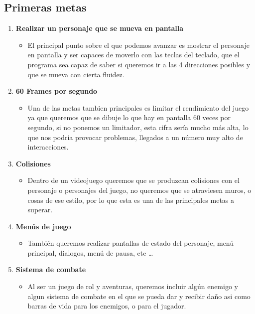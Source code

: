 \documentclass[a4paper]{article}
\begin{document}
\subsection{Primeras metas}
\begin{enumerate}
    \item \textbf{Realizar un personaje que se mueva en pantalla}
          \begin{itemize}
              \item El principal punto sobre el que podemos avanzar es mostrar el personaje en pantalla y ser capaces de moverlo con las teclas del teclado, que el programa sea capaz de saber si queremos ir a las 4 direcciones posibles y que se mueva con cierta fluidez.
          \end{itemize}

    \item \textbf{60 Frames por segundo}
          \begin{itemize}
              \item Una de las metas tambien principales es limitar el rendimiento del juego ya que queremos que se dibuje lo que hay en pantalla 60 veces por segundo, si no ponemos un limitador, esta cifra sería mucho más alta, lo que nos podria provocar problemas, llegados a un número muy alto de interacciones.
          \end{itemize}

    \item \textbf{Colisiones}
          \begin{itemize}
              \item Dentro de un videojuego queremos que se produzcan colisiones con el personaje o personajes del juego, no queremos que se atraviesen muros, o cosas de ese estilo, por lo que esta es una de las principales metas a superar.
          \end{itemize}

    \item \textbf{Menús de juego}
          \begin{itemize}
              \item También queremos realizar pantallas de estado del personaje, menú principal, dialogos, menú de pausa, etc \dots
          \end{itemize}

    \item \textbf{Sistema de combate}
          \begin{itemize}
              \item Al ser un juego de rol y aventuras, queremos incluir algún enemigo y algun sistema de combate en el que se pueda dar y recibir daño asi como barras de vida para los enemigos, o para el jugador.
          \end{itemize}


\end{enumerate}
\end{document}
